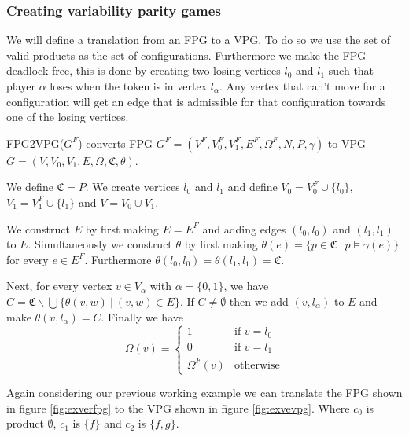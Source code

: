 \subsubsection{Creating variability parity games}
We will define a translation from an FPG to a VPG. To do so we use the set of valid products as the set of configurations. Furthermore we make the FPG deadlock free, this is done by creating two losing vertices $l_0$ and $l_1$ such that player $\alpha$ loses when the token is in vertex $l_\alpha$. Any vertex that can't move for a configuration will get an edge that is admissible for that configuration towards one of the losing vertices.
\begin{definition}
	\label{def_FPG2VPG}
	FPG2VPG($G^F$) converts FPG $G^F = (V^F, V_0^F, V_1^F, E^F, \Omega^F, N, P, \gamma)$ to VPG $G = (V, V_0, V_1, E, \Omega, \mathfrak{C}, \theta)$.
	
	We define $\mathfrak{C} = P$. We create vertices $l_0$ and $l_1$ and define $V_0 = V_0^F \cup \{l_0\}$, $V_1 = V_1^F \cup \{l_1\}$ and $V = V_0 \cup V_1$.
	
	We construct $E$ by first making $E = E^F$ and adding edges $(l_0, l_0)$ and $(l_1, l_1)$ to $E$. Simultaneously we construct $\theta$ by first making $\theta(e) = \{p \in \mathfrak{C}\ |\ p \models \gamma(e)\}$ for every $e \in E^F$. Furthermore $\theta(l_0,l_0) = \theta(l_1,l_1) = \mathfrak{C}$.
	
	Next, for every vertex $v \in V_\alpha$ with $\alpha = \{0,1\}$, we have $C = \mathfrak{C} \backslash \bigcup \{\theta(v,w)\ |\ (v,w) \in E\}$. If $C \neq \emptyset$ then we add $(v, l_\alpha)$ to $E$ and make $\theta(v,l_\alpha) = C$.
	Finally we have 
	\[ \Omega(v) = \begin{cases}
	1  & \text{if } v = l_0 \\
	0 & \text{if } v = l_1 \\
	\Omega^F(v) &\text{otherwise}
	\end{cases} \]
\end{definition}
Again considering our previous working example we can translate the FPG shown in figure \ref{fig:exverfpg} to the VPG shown in figure \ref{fig:exvevpg}. Where $c_0$ is product $\emptyset$, $c_1$ is $\{f\}$ and $c_2$ is $\{f,g\}$.


